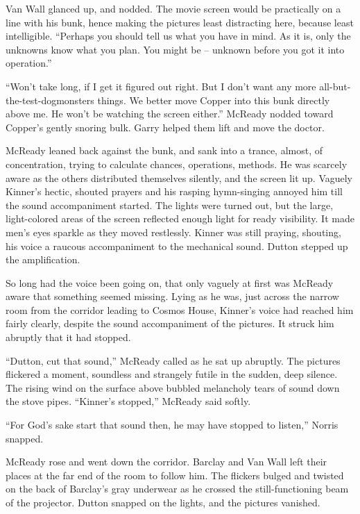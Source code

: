 \documentclass[letterpaper,openany,12pt]{memoir}		%
\begin{document}
Van Wall glanced up, and nodded. The movie screen would be practically on a line
with his bunk, hence making the pictures least distracting here, because least
intelligible. ``Perhaps you should tell us what you have in mind. As it is, only
the unknowns know what you plan. You might be -- unknown before you got it into
operation.''

``Won't take long, if I get it figured out right. But I don't want any more
all-but-the-test-dogmonsters things. We better move Copper into this bunk
directly above me. He won't be watching the screen either.'' McReady nodded
toward Copper's gently snoring bulk. Garry helped them lift and move the doctor.

McReady leaned back against the bunk, and sank into a trance, almost, of
concentration, trying to calculate chances, operations, methods. He was scarcely
aware as the others distributed themselves silently, and the screen lit up.
Vaguely Kinner's hectic, shouted prayers and his rasping hymn-singing annoyed
him till the sound accompaniment started. The lights were turned out, but the
large, light-colored areas of the screen reflected enough light for ready
visibility. It made men's eyes sparkle as they moved restlessly. Kinner was
still praying, shouting, his voice a raucous accompaniment to the mechanical
sound. Dutton stepped up the amplification.

So long had the voice been going on, that only vaguely at first was McReady
aware that something seemed missing. Lying as he was, just across the narrow
room from the corridor leading to Cosmos House, Kinner's voice had reached him
fairly clearly, despite the sound accompaniment of the pictures. It struck him
abruptly that it had stopped.

``Dutton, cut that sound,'' McReady called as he sat up abruptly. The pictures
flickered a moment, soundless and strangely futile in the sudden, deep silence.
The rising wind on the surface above bubbled melancholy tears of sound down the
stove pipes. ``Kinner's stopped,'' McReady said softly.

``For God's sake start that sound then, he may have stopped to listen,'' Norris
snapped.

McReady rose and went down the corridor. Barclay and Van Wall left their places
at the far end of the room to follow him. The flickers bulged and twisted on the
back of Barclay's gray underwear as he crossed the still-functioning beam of the
projector. Dutton snapped on the lights, and the pictures vanished.
\end{document}
